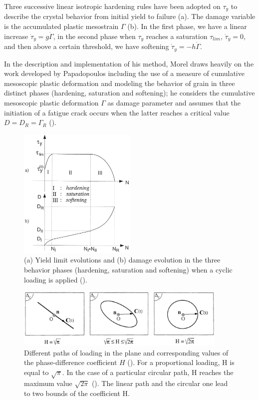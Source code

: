 Three successive linear isotropic hardening rules have
been adopted on $\tau_y$ to describe the crystal behavior from
initial yield to failure (a). The damage variable is the accumulated plastic mesostrain $\Gamma$ (b).
In the first phase, we have a linear increase $\dot{\tau}_y=g\dot{\Gamma}$, in the second phase when $\tau_y$ reaches a saturation $\tau_{lim}$, $\dot{\tau}_y=0$, and then above a certain threshold, we have softening $\dot{\tau}_y=-h\dot{\Gamma}$.

In the description and implementation of his method, Morel draws heavily on the work developed by Papadopoulos including the use of a measure of cumulative mesoscopic plastic deformation   and modeling the behavior of grain in three distinct phases (hardening, saturation and softening); he considers the cumulative mesoscopic plastic deformation $\Gamma$ as damage parameter and assumes that the initiation of a fatigue crack occurs when the latter reaches a
critical value $D = D_R = \Gamma_R$ (). 
\begin{figure}[h!]
	\centering
	\includegraphics[width=0.5\textwidth]{figures//3phases.png} 
	\caption{(a) Yield limit evolutions and (b) damage evolution in the three behavior phases (hardening, saturation and softening) when a cyclic loading is applied (\cite{Morel2000101}).}
	\label{3phases}
\end{figure}

\begin{figure}[h!]
	\centering
	\includegraphics[width=0.9\textwidth]{figures//H.png} 
	\caption{Different paths of loading in the plane and corresponding values of the phase-difference coefficient $H$ (\cite{Morel2000101}). For a proportional loading, H is equal to $\sqrt{\pi}$. In the case of a particular
		circular path, H reaches the maximum value $\sqrt{2\pi}$ (). 
		The linear path and the circular one lead to two bounds of
		the coefficient H.}
	\label{figH}
\end{figure}


